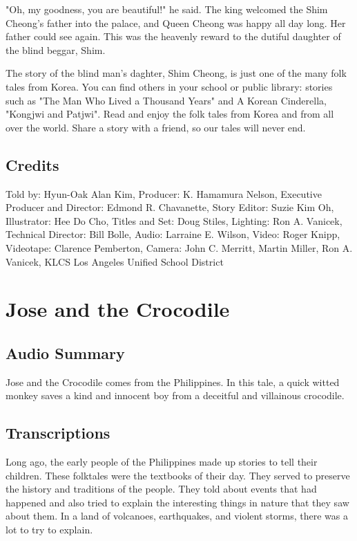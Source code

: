 "Oh, my goodness, you are beautiful!" he said. The king welcomed the Shim Cheong's father into the palace, and Queen Cheong was happy all day long. Her father could see again. This was the heavenly reward to the dutiful daughter of the blind beggar, Shim.

The story of the blind man's daghter, Shim Cheong, is just one of the many folk tales from Korea. You can find others in your school or public library: stories such as "The Man Who Lived a Thousand Years" and A Korean Cinderella, "Kongjwi and Patjwi". Read and enjoy the folk tales from Korea and from all over the world. Share a story with a friend, so our tales will never end.

\subsection{Credits}

Told by: Hyun-Oak Alan Kim,
Producer: K. Hamamura Nelson,
Executive Producer and Director: Edmond R. Chavanette,
Story Editor: Suzie Kim Oh,
Illustrator: Hee Do Cho,
Titles and Set: Doug Stiles,
Lighting: Ron A. Vanicek,
Technical Director: Bill Bolle,
Audio: Larraine E. Wilson,
Video: Roger Knipp,
Videotape: Clarence Pemberton,
Camera: John C. Merritt, Martin Miller, Ron A. Vanicek,
KLCS Los Angeles Unified School District

\section{Jose and the Crocodile}

\subsection{Audio Summary}

Jose and the Crocodile comes from the Philippines.
In this tale, a quick witted monkey saves a kind and innocent boy from a deceitful and villainous crocodile.

\subsection{Transcriptions}

Long ago, the early people of the Philippines made up stories to tell their children. These folktales were the textbooks of their day. They served to preserve the history and traditions of the people. They told about events that had happened and also tried to explain the interesting things in nature that they saw about them. In a land of volcanoes, earthquakes, and violent storms, there was a lot to try to explain.

